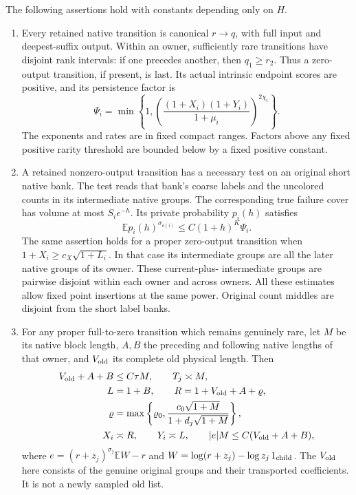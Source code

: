 \begin{proposition}
\label{upper:established-inputs}
The following assertions hold with constants depending only on $H$.
\begin{enumerate}
\item Every retained native transition is canonical
$r\to q$, with full input and deepest-suffix output.  Within an owner,
sufficiently rare transitions have disjoint rank intervals: if one
precedes another, then $q_1\geq r_2$.  Thus a zero-output transition,
if present, is last.  Its actual intrinsic endpoint scores are positive,
and its persistence factor is
\[
 \Psi_i=\min\left\{1,
 \left(\frac{(1+X_i)(1+Y_i)}{1+\mu_i}\right)^{2\chi_i}\right\}.
\]
The exponents and rates are in fixed compact ranges.  Factors above
any fixed positive rarity threshold are bounded below by a fixed
positive constant.

\item A retained nonzero-output transition has a necessary test on
an original short native bank.  The test reads that bank's coarse
labels and the uncolored counts in its intermediate native groups.
The corresponding true failure cover has volume at most $S_i e^{-h}$.
Its private probability $p_i(h)$ satisfies
\[
 \mathbb E p_i(h)^{\sigma_{o(i)}}
       \leq C(1+h)^K\Psi_i .
\]
The same assertion holds for a proper zero-output transition when
$1+X_i\geq c_X\sqrt{1+L_i}$.  In that case its intermediate groups
are all the later native groups of its owner.  These current-plus-
intermediate groups are pairwise disjoint within each owner and across
owners.  All these estimates allow fixed point insertions at the same
power.  Original count middles are disjoint from the short label banks.

\item For any proper full-to-zero transition which remains genuinely
rare, let $M$ be its native block length, $A,B$ the preceding and
following native lengths of that owner, and $V_{\rm old}$ its complete
old physical length.  Then
\begin{align}
 V_{\rm old}+A+B&\leq C\tau M,\qquad T_j\asymp M,
 \label{upper:dominance}\\
 L&=1+B,\qquad R=1+V_{\rm old}+A+\varrho,\notag\\
 \varrho&=\max\left\{\varrho_0,
       \frac{c_0\sqrt{1+M}}{1+d_j\sqrt{1+M}}\right\},\notag\\
 X_i&\asymp R,\qquad Y_i\asymp L,\qquad
 |e|M\leq C(V_{\rm old}+A+B),
 \label{upper:zero-scales}
\end{align}
where $e=(r+z_j)^{\sigma_j}\mathbb EW-r$ and
$W=\log(r+z_j)-\log z_j\,1_{\rm child}$.
The $V_{\rm old}$ here consists of the genuine original groups and
their transported coefficients.  It is not a newly sampled old list.


\end{enumerate}
\end{proposition}
